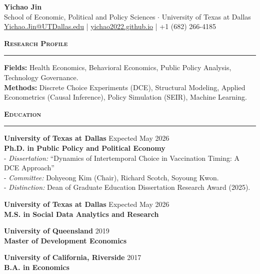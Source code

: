 \documentclass[11pt, letterpaper]{article}
\newcommand{\ressection}[1]{
    \vspace{10pt}
    \noindent\textbf{\large \textsc{#1}}
    \vspace{-2pt}
    \hrule
    \vspace{5pt}
}
\begin{document}
\begin{center}
    {\huge \textbf{Yichao Jin}} \\
    \vspace{0.6em}
    School of Economic, Political and Policy Sciences $\cdot$ University of Texas at Dallas \\
    \vspace{0.4em}
    \href{mailto:Yichao.Jin@UTDallas.edu}{Yichao.Jin@UTDallas.edu} \quad | \quad \href{https://yichao2022.github.io}{yichao2022.github.io} \quad | \quad +1 (682) 266-4185
\end{center}

\vspace{0.2em}

\ressection{Research Profile}
\noindent \textbf{Fields:} Health Economics, Behavioral Economics, Public Policy Analysis, Technology Governance. \\
\textbf{Methods:} Discrete Choice Experiments (DCE), Structural Modeling, Applied Econometrics (Causal Inference), Policy Simulation (SEIR), Machine Learning.

\ressection{Education}
\noindent \textbf{University of Texas at Dallas} \hfill Expected May 2026 \\
\textbf{Ph.D. in Public Policy and Political Economy} \\
- \textit{Dissertation:} ``Dynamics of Intertemporal Choice in Vaccination Timing: A DCE Approach'' \\
- \textit{Committee:} Dohyeong Kim (Chair), Richard Scotch, Soyoung Kwon. \\
- \textit{Distinction:} Dean of Graduate Education Dissertation Research Award (2025).

\vspace{0.4em}
\noindent \textbf{University of Texas at Dallas} \hfill Expected May 2026 \\
\textbf{M.S. in Social Data Analytics and Research}

\vspace{0.4em}
\noindent \textbf{University of Queensland} \hfill 2019 \\
\textbf{Master of Development Economics}

\vspace{0.4em}
\noindent \textbf{University of California, Riverside} \hfill 2017 \\
\textbf{B.A. in Economics}
\end{document}
